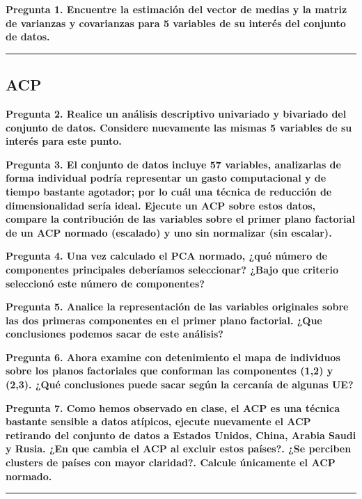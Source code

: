\documentclass[
]{article}
\begin{document}
\noindent\textbf{Pregunta 1. Encuentre la estimación del vector de medias y la matriz de varianzas y covarianzas para 5 variables de su interés del conjunto de datos.}

\begin{center}\rule{0.5\linewidth}{0.5pt}\end{center}

\subsection{ACP}\label{acp}

\noindent\textbf{Pregunta 2. Realice un análisis descriptivo univariado y bivariado del conjunto de datos. Considere nuevamente las mismas 5 variables de su interés para este punto.}

\noindent\textbf{Pregunta 3. El conjunto de datos incluye 57 variables, analizarlas de forma individual podría representar un gasto computacional y de tiempo bastante agotador; por lo cuál una técnica de reducción de dimensionalidad sería ideal. Ejecute un ACP sobre estos datos, compare la contribución de las variables sobre el primer plano factorial de un ACP normado (escalado) y uno sin normalizar (sin escalar).}

\noindent\textbf{Pregunta 4. Una vez calculado el PCA normado, ¿qué número de componentes principales deberíamos seleccionar? ¿Bajo que criterio seleccionó este número de componentes?}

\noindent\textbf{Pregunta 5. Analice la representación de las variables originales sobre las dos primeras componentes en el primer plano factorial. ¿Que conclusiones podemos sacar de este análisis?}

\noindent\textbf{Pregunta 6. Ahora examine con detenimiento el mapa de individuos sobre los planos factoriales que conforman las componentes (1,2) y (2,3). ¿Qué conclusiones puede sacar según la cercanía de algunas UE?}

\noindent\textbf{Pregunta 7. Como hemos observado en clase, el ACP es una técnica bastante sensible a datos atípicos, ejecute nuevamente el ACP retirando del conjunto de datos a Estados Unidos, China, Arabia Saudi y Rusia. ¿En que cambia el ACP al excluir estos países?. ¿Se perciben clusters de países con mayor claridad?. Calcule únicamente el ACP normado.}

\begin{center}\rule{0.5\linewidth}{0.5pt}\end{center}
\end{document}
